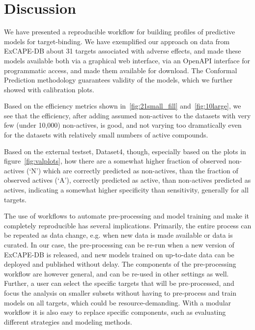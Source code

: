 \documentclass[utf8]{frontiersSCNS} %
\begin{document}
\section{Discussion} \label{Discussion}

We have presented a reproducible workflow for building profiles of predictive
models for target-binding. We have exemplified our approach on data from
ExCAPE-DB about 31 targets associated with adverse effects, and made these
models available both via a graphical web interface, via an OpenAPI interface
for programmatic access, and made them available for download.
The Conformal Prediction methodology guarantees validity of the models, which
we further showed with calibration plots.

Based on the efficiency metrics shown in~\ref{fig:21small_fill}
and~\ref{fig:10large}, we see that the efficiency, after adding assumed
non-actives to the datasets with very few (under 10,000) non-actives, is
good, and not varying too dramatically even for the datasets with relatively
small numbers of active compounds.

Based on the external testset, Dataset4, though, especially based on the
plots in figure~\ref{fig:valplots}, how there are a somewhat higher fraction
of observed non-actives (`N') which are correctly predicted as non-actives,
than the fraction of observed actives (`A'), correctly predicted as active,
than non-actives predicted as actives, indicating a somewhat higher
specificity than sensitivity, generally for all targets.

The use of workflows to automate pre-processing and model training and make it
completely reproducible has several implications. Primarily, the entire process
can be repeated as data change, e.g. when new data is made available or data is
curated. In our case, the pre-processing can be re-run when a new version of
ExCAPE-DB is released, and new models trained on up-to-date data can be
deployed and published without delay. The components of the pre-processing
workflow are however general, and can be re-used in other settings as well.
Further, a user can select the specific targets that will be pre-processed, and
focus the analysis on smaller subsets without having to pre-process and train
models on all targets, which could be resource-demanding. With a modular
workflow it is also easy to replace specific components, such as evaluating
different strategies and modeling methods.
\end{document}
